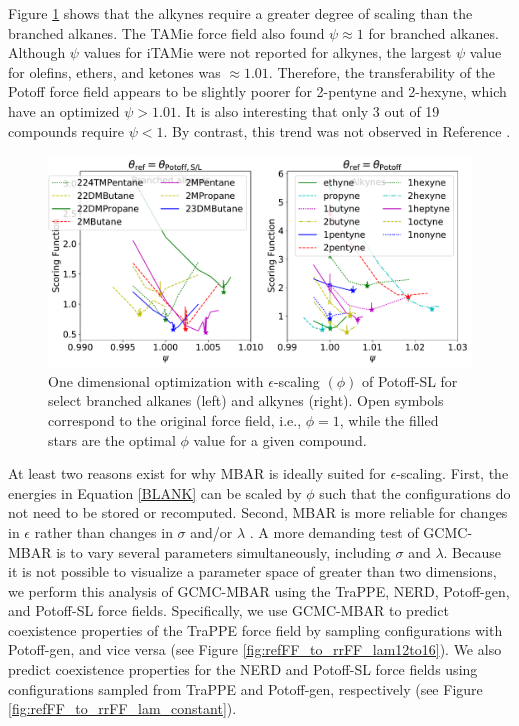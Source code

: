 \documentclass[journal=jced,manuscript=article]{achemso}
\begin{document}
Figure \ref{fig:epsilon_scaling} shows that the alkynes require a greater degree of scaling than the branched alkanes. The TAMie force field also found $\psi \approx 1$ for branched alkanes. Although $\psi$ values for iTAMie were not reported for alkynes, the largest $\psi$ value for olefins, ethers, and ketones was $\approx 1.01$. Therefore, the transferability of the Potoff force field appears to be slightly poorer for 2-pentyne and 2-hexyne, which have an optimized $\psi > 1.01$. It is also interesting that only 3 out of 19 compounds require $\psi < 1$. By contrast, this trend was not observed in Reference . 


	\begin{figure}[htb!]
		\centering
		\includegraphics[width=6.4in]{Optimal_epsilon_scaling.pdf}
		\caption{One dimensional optimization with $\epsilon$-scaling $(\phi)$ of Potoff-SL for select branched alkanes (left) and alkynes (right). Open symbols correspond to the original force field, i.e., $\phi = 1$, while the filled stars are the optimal $\phi$ value for a given compound.}
		\label{fig:epsilon_scaling}
	\end{figure}

 
At least two reasons exist for why MBAR is ideally suited for $\epsilon$-scaling. First, the energies in Equation \ref{BLANK} can be scaled by $\phi$ such that the configurations do not need to be stored or recomputed. Second, MBAR is more reliable for changes in $\epsilon$ rather than changes in $\sigma$ and/or $\lambda$ \cite{Postdoc_1}. A more demanding test of GCMC-MBAR is to vary several parameters simultaneously, including $\sigma$ and $\lambda$. Because it is not possible to visualize a parameter space of greater than two dimensions, we perform this analysis of GCMC-MBAR using the TraPPE, NERD, Potoff-gen, and Potoff-SL force fields. Specifically, we use GCMC-MBAR to predict coexistence properties of the TraPPE force field by sampling configurations with Potoff-gen, and vice versa (see Figure \ref{fig:refFF_to_rrFF_lam12to16}). We also predict coexistence properties for the NERD and Potoff-SL force fields using configurations sampled from TraPPE and Potoff-gen, respectively (see Figure \ref{fig:refFF_to_rrFF_lam_constant}).
\end{document}
